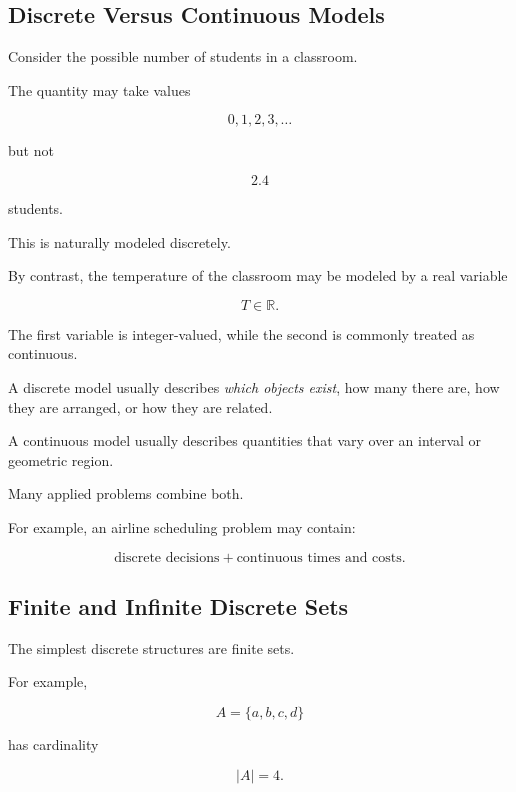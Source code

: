 \subsection{Discrete Versus Continuous Models}
\label{subsec:discrete-versus-continuous}

Consider the possible number of students in a classroom.

The quantity may take values

\[
0,1,2,3,\ldots
\]

but not

\[
2.4
\]

students.

This is naturally modeled discretely.

By contrast, the temperature of the classroom may be modeled by a real
variable

\[
T\in\mathbb{R}.
\]

The first variable is integer-valued, while the second is commonly
treated as continuous.

\begin{conceptbox}
A discrete model usually describes \emph{which objects exist}, how many
there are, how they are arranged, or how they are related.

A continuous model usually describes quantities that vary over an
interval or geometric region.
\end{conceptbox}

Many applied problems combine both.

For example, an airline scheduling problem may contain:

\[
\text{discrete decisions}
+
\text{continuous times and costs}.
\]

\subsection{Finite and Infinite Discrete Sets}
\label{subsec:finite-infinite-discrete}

The simplest discrete structures are finite sets.

For example,

\[
A=\{a,b,c,d\}
\]

has cardinality

\[
|A|=4.
\]

